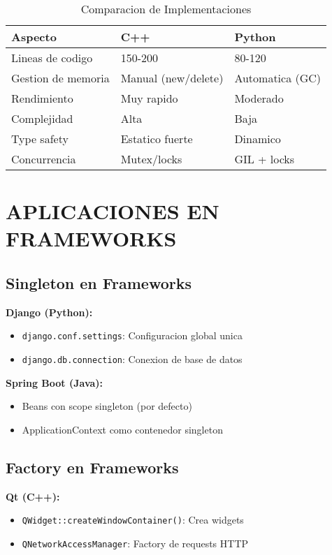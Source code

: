 \documentclass[11pt,a4paper]{article}
\begin{document}
\begin{table}[H]
\centering
\caption{Comparacion de Implementaciones}
\begin{tabular}{|l|l|l|}
\hline
\textbf{Aspecto} & \textbf{C++} & \textbf{Python} \\ \hline
Lineas de codigo & 150-200 & 80-120 \\ \hline
Gestion de memoria & Manual (new/delete) & Automatica (GC) \\ \hline
Rendimiento & Muy rapido & Moderado \\ \hline
Complejidad & Alta & Baja \\ \hline
Type safety & Estatico fuerte & Dinamico \\ \hline
Concurrencia & Mutex/locks & GIL + locks \\ \hline
\end{tabular}
\end{table}

\section{APLICACIONES EN FRAMEWORKS}

\subsection{Singleton en Frameworks}

\textbf{Django (Python):}
\begin{itemize}
    \item \texttt{django.conf.settings}: Configuracion global unica
    \item \texttt{django.db.connection}: Conexion de base de datos
\end{itemize}

\textbf{Spring Boot (Java):}
\begin{itemize}
    \item Beans con scope singleton (por defecto)
    \item ApplicationContext como contenedor singleton
\end{itemize}

\subsection{Factory en Frameworks}

\textbf{Qt (C++):}
\begin{itemize}
    \item \texttt{QWidget::createWindowContainer()}: Crea widgets
    \item \texttt{QNetworkAccessManager}: Factory de requests HTTP
\end{itemize}
\end{document}
